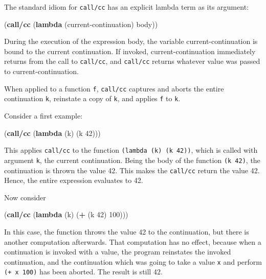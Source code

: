 \documentclass[12pt,a4paper,oneside,openright]{book}
\newenvironment{Shaded}{\begin{snugshade}}{\end{snugshade}}
\newcommand{\KeywordTok}[1]{\textcolor[rgb]{0.13,0.29,0.53}{\textbf{{#1}}}}
\newcommand{\DecValTok}[1]{\textcolor[rgb]{0.00,0.00,0.81}{{#1}}}
\newcommand{\NormalTok}[1]{{#1}}
\begin{document}
The standard idiom for \texttt{call/cc} has an explicit lambda term as
its argument:

\begin{Shaded}
\begin{Highlighting}[]
    \NormalTok{(}\KeywordTok{call/cc} \NormalTok{(}\KeywordTok{lambda} \NormalTok{(current-continuation)}
      \NormalTok{body))}
\end{Highlighting}
\end{Shaded}

During the execution of the expression body, the variable
current-continuation is bound to the current continuation. If invoked,
current-continuation immediately returns from the call to
\texttt{call/cc}, and \texttt{call/cc} returns whatever value was passed
to current-continuation.

When applied to a function \texttt{f}, \texttt{call/cc} captures and
aborts the entire continuation \texttt{k}, reinstate a copy of
\texttt{k}, and applies \texttt{f} to \texttt{k}.

Consider a first example:

\begin{Shaded}
\begin{Highlighting}[]
    \NormalTok{(}\KeywordTok{call/cc}
      \NormalTok{(}\KeywordTok{lambda} \NormalTok{(k)}
        \NormalTok{(k }\DecValTok{42}\NormalTok{)))}
\end{Highlighting}
\end{Shaded}

This applies \texttt{call/cc} to the function
\texttt{(lambda\ (k)\ (k\ 42))}, which is called with argument
\texttt{k}, the current continuation. Being the body of the function
\texttt{(k\ 42)}, the continuation is thrown the value 42. This makes
the \texttt{call/cc} return the value 42. Hence, the entire expression
evaluates to 42.

Now consider

\begin{Shaded}
\begin{Highlighting}[]
    \NormalTok{(}\KeywordTok{call/cc}
      \NormalTok{(}\KeywordTok{lambda} \NormalTok{(k)}
        \NormalTok{(}\KeywordTok{+} \NormalTok{(k }\DecValTok{42}\NormalTok{) }\DecValTok{100}\NormalTok{)))}
\end{Highlighting}
\end{Shaded}

In this case, the function throws the value 42 to the continuation, but
there is another computation afterwards. That computation has no effect,
because when a continuation is invoked with a value, the program
reinstates the invoked continuation, and the continuation which was
going to take a value \texttt{x} and perform \texttt{(+\ x\ 100)} has
been aborted. The result is still 42.
\end{document}
